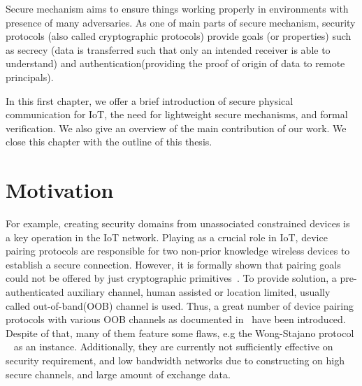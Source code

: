 Secure mechanism aims to ensure things working properly in environments with presence of many adversaries. As one of main parts of secure mechanism, security protocols (also called cryptographic protocols) provide goals (or properties) such as secrecy (data is transferred such that only an intended receiver is able to understand) and authentication(providing the proof of origin of data to remote principals). 

In this first chapter, we offer a brief introduction of secure physical communication for IoT, the need for lightweight secure mechanisms, and formal verification. We also give an overview of the main contribution of our work. We close this chapter with the outline of this thesis. 

\section{Motivation}


For example, creating security domains from unassociated constrained devices is a key operation in the IoT network. Playing as a crucial role in IoT, device pairing protocols are responsible for two non-prior knowledge wireless devices to establish a secure connection. However, it is formally shown that pairing goals could not be offered by just cryptographic primitives~\cite{Burrows90alogic}. To provide solution, a pre-authenticated auxiliary channel, human assisted or location limited, usually called out-of-band(OOB) channel  is used. Thus, a great number of device pairing protocols with various OOB channels as documented in~\cite{6687314} have been introduced. Despite of that, many of them feature some flaws, e.g the Wong-Stajano protocol ~\cite{10.1109/MPRV.2007.76} as an instance. Additionally, they are currently not sufficiently effective on security requirement, and low bandwidth networks due to constructing on high secure channels, and large amount of exchange data. 

